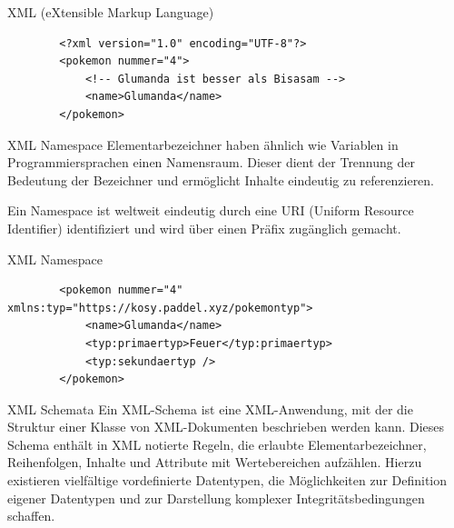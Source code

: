 \begin{example}{XML (eXtensible Markup Language)}
    \begin{lstlisting}
        <?xml version="1.0" encoding="UTF-8"?>
        <pokemon nummer="4">
            <!-- Glumanda ist besser als Bisasam -->
            <name>Glumanda</name>
        </pokemon>
    \end{lstlisting}
\end{example}

\begin{bonus}{XML Namespace}
    Elementarbezeichner haben ähnlich wie Variablen in Programmiersprachen einen Namensraum.
    Dieser dient der Trennung der Bedeutung der Bezeichner und ermöglicht Inhalte eindeutig zu referenzieren.

    Ein Namespace ist weltweit eindeutig durch eine URI (Uniform Resource Identifier) identifiziert und wird über einen Präfix zugänglich gemacht.
\end{bonus}

\begin{example}{XML Namespace}
    \begin{lstlisting}
        <pokemon nummer="4" xmlns:typ="https://kosy.paddel.xyz/pokemontyp">
            <name>Glumanda</name>
            <typ:primaertyp>Feuer</typ:primaertyp>
            <typ:sekundaertyp />
        </pokemon>
    \end{lstlisting}
\end{example}

\begin{defi}{XML Schemata}
    Ein XML-Schema ist eine XML-Anwendung, mit der die Struktur einer Klasse von XML-Dokumenten beschrieben werden kann.
    Dieses Schema enthält in XML notierte Regeln, die erlaubte Elementarbezeichner, Reihenfolgen, Inhalte und Attribute mit Wertebereichen aufzählen.
    Hierzu existieren vielfältige vordefinierte Datentypen, die Möglichkeiten zur Definition eigener Datentypen und zur Darstellung komplexer Integritätsbedingungen schaffen.
\end{defi}

